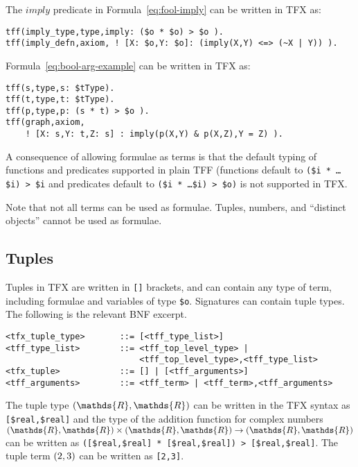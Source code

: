 \documentclass{easychair}
\begin{document}
The $\mathit{imply}$ predicate in Formula~\ref{eq:fool-imply} can 
be written in TFX as:
\begin{verbatim}
tff(imply_type,type,imply: ($o * $o) > $o ).
tff(imply_defn,axiom, ! [X: $o,Y: $o]: (imply(X,Y) <=> (~X | Y)) ).
\end{verbatim}


Formula~\ref{eq:bool-arg-example} can be written in TFX as:
\begin{verbatim}
tff(s,type,s: $tType).
tff(t,type,t: $tType).
tff(p,type,p: (s * t) > $o ).
tff(graph,axiom,
    ! [X: s,Y: t,Z: s] : imply(p(X,Y) & p(X,Z),Y = Z) ).
\end{verbatim}

A consequence of allowing formulae as terms is that the default typing of 
functions and predicates supported in plain TFF (functions default to 
{\tt (\$i * \ldots * \$i) > \$i} and predicates default to 
{\tt (\$i * \ldots * \$i) > \$o)} is not supported in TFX.

Note that not all terms can be used as formulae.
Tuples, numbers, and ``distinct objects'' cannot be used as formulae.

\subsection{Tuples}

Tuples in TFX are written in {\tt []} brackets, and can contain any type of 
term, including formulae and variables of type {\tt \$o}. 
Signatures can contain tuple types. 
The following is the relevant BNF excerpt.
\begin{verbatim}
<tfx_tuple_type>       ::= [<tff_type_list>]
<tff_type_list>        ::= <tff_top_level_type> |
                           <tff_top_level_type>,<tff_type_list>
<tfx_tuple>            ::= [] | [<tff_arguments>]
<tff_arguments>        ::= <tff_term> | <tff_term>,<tff_arguments>
\end{verbatim}

The tuple type $\tuple{\mathds{R},\mathds{R}}$ can be written in the TFX 
syntax as \verb|[$real,$real]| and the type of the addition function for 
complex numbers $\tuple{\mathds{R},\mathds{R}} \times 
\tuple{\mathds{R},\mathds{R}} \to \tuple{\mathds{R},\mathds{R}}$ can be 
written as \verb'([$real,$real] * [$real,$real]) > [$real,$real]'. 
The tuple term $({2,3})$ can be written as \verb'[2,3]'.
\end{document}
